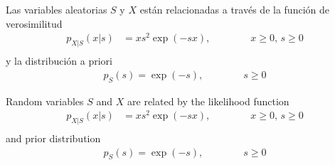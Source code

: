 \ifspanish

\question[25]   %

Las variables aleatorias $S$ y $X$ están relacionadas a través de la función de verosimilitud
\begin{align*}
  p_{X|S}(x|s) &= x s^2 \exp\left(- s x\right),  \qquad \qquad x \ge 0, \, s\ge 0   \\
\end{align*}
y la distribución a priori
\begin{align*}
p_S(s) = \exp(-s),  \qquad\qquad s\ge 0
\end{align*}


\else

\question[25]   %

Random variables $S$ and $X$ are related by the likelihood function
\begin{align*}
  p_{X|S}(x|s) &= x s^2 \exp\left(- s x\right),  \qquad \qquad x \ge 0, \, s\ge 0   \\
\end{align*}
and prior distribution
\begin{align*}
p_S(s) = \exp(-s),  \qquad\qquad s\ge 0
\end{align*}

